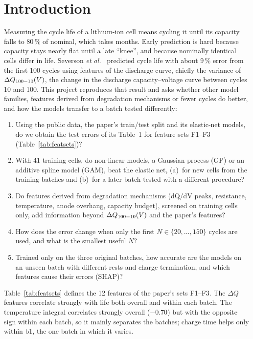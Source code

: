 \section{Introduction}
\label{sec:intro}

Measuring the cycle life of a lithium-ion cell means cycling it until its
capacity falls to 80\,\% of nominal, which takes months. Early prediction is
hard because capacity stays nearly flat until a late ``knee'', and because
nominally identical cells differ in life. Severson \textit{et
al.}~\cite{severson2019} predicted cycle life with about 9\,\% error from the
first 100 cycles using features of the discharge curve, chiefly the variance
of $\Delta Q_{100-10}(V)$, the change in the discharge capacity--voltage curve between cycles
10 and 100. This project reproduces that result and asks whether other
model families, features derived from degradation mechanisms or fewer cycles
do better, and how the models transfer to a batch tested differently:
\begin{enumerate}
  \item[\textbf{RQ1}] Using the public data, the paper's train/test split
  and its elastic-net models, do we obtain the test errors of its Table~1
  for feature sets F1--F3 (Table~\ref{tab:featsets})?
  \item[\textbf{RQ2}] With 41 training cells, do non-linear models, a
  Gaussian process (GP) or an additive spline model (GAM), beat the elastic
  net, (a)~for new cells from the training batches and (b)~for a later batch
  tested with a different procedure?
  \item[\textbf{RQ3}] Do features derived from degradation mechanisms
  (dQ/dV peaks, resistance, temperature, anode overhang, capacity budget),
  screened on training cells only, add information beyond $\Delta Q_{100-10}(V)$ and the
  paper's features?
  \item[\textbf{RQ4}] How does the error change when only the first
  $N\in\{20,\dots,150\}$ cycles are used, and what is the smallest useful
  $N$?
  \item[\textbf{RQ5}] Trained only on the three original batches, how
  accurate are the models on an unseen batch with different rests and charge
  termination, and which features cause their errors (SHAP)?
\end{enumerate}

Table~\ref{tab:featsets} defines the 12 features of the paper's sets
F1--F3. The $\Delta Q$ features correlate strongly with life both overall
and within each batch. The temperature integral correlates strongly overall
($-0.70$) but with the opposite sign within each batch, so it mainly
separates the batches; charge time helps only within b1, the one batch in
which it varies.

